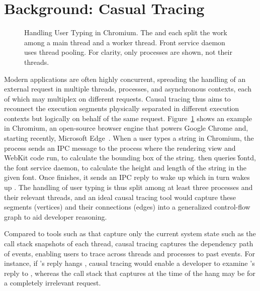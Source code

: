 \section{Background: Casual Tracing} \label{sec:background}

\begin{figure}[tb]
	\footnotesize
    \centering
    \caption{Handling User Typing in Chromium.  The  and
       each split the work among a main thread and a worker
      thread.  Front service daemon  uses thread pooling.  For
      clarity, only processes are shown, not their threads.}
    \label{fig:chromium-normal}
\end{figure}

Modern applications are often highly concurrent, spreading the handling of
an external request in multiple threads, processes, and asynchronous
contexts, each of which may multiplex on different requests.  Causal
tracing thus aims to reconnect the execution segments physically separated
in different execution contexts but logically on behalf of the same
request.  Figure~\ref{fig:chromium-normal} shows an example in Chromium,
an open-source browser engine that powers Google Chrome and, starting
recently, Microsoft Edge~\cite{chromiumurl}. When a user types a string in
Chromium, the  process sends an IPC message to the 
process where the rendering view and WebKit code run, to calculate the
bounding box of the string.   then queries \v{fontd}, the font
service daemon, to calculate the height and length of the string in the
given font.  Once  finishes, it sends an IPC reply to wake up
 which in turn wakes up .  The handling of user
typing is thus split among at least three processes and their relevant
threads, and an ideal causal tracing tool would capture these segments
(vertices) and their connections (edges) into a generalized control-flow
graph to aid developer reasoning.

Compared to tools such as \spindump that capture only the current system
state such as the call stack snapshots of each thread, causal tracing
captures the dependency path of events, enabling users to trace across
threads and processes to past events.  For instance, if 's
reply hangs , causal tracing would enable a developer to
examine 's reply to , whereas the  call
stack that \spindump captures at the time of the hang may be for a
completely irrelevant request.

